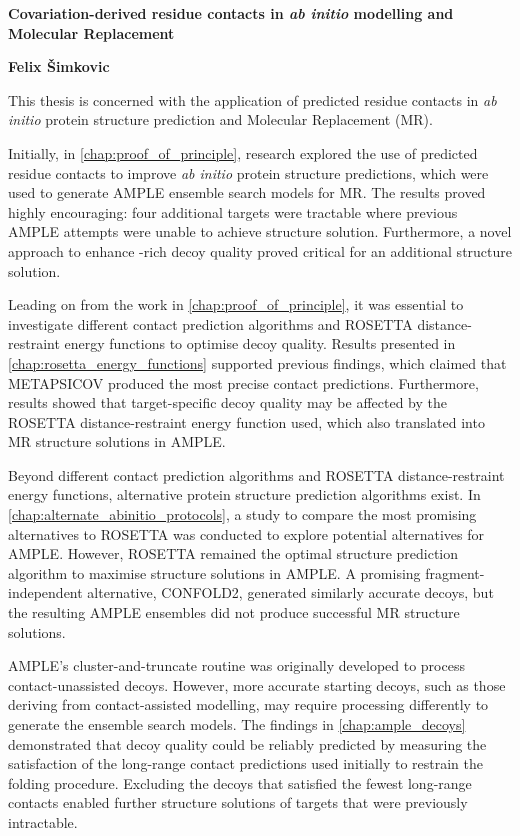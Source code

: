 \singlespacing
\begin{center}
    \Large
    \textbf{Covariation-derived residue contacts in \textit{ab initio} modelling and Molecular Replacement}

    \vspace{0.5cm}
    \large
    \textbf{Felix \v{S}imkovic}
    \vspace{0.5cm}
\end{center}

This thesis is concerned with the application of predicted residue contacts in \textit{ab initio} protein structure prediction and Molecular Replacement (MR).

Initially, in \cref{chap:proof_of_principle}, research explored the use of predicted residue contacts to improve \textit{ab initio} protein structure predictions, which were used to generate AMPLE ensemble search models for MR. The results proved highly encouraging: four additional targets were tractable where previous AMPLE attempts were unable to achieve structure solution. Furthermore, a novel approach to enhance \textbeta-rich decoy quality proved critical for an additional structure solution. 

Leading on from the work in \cref{chap:proof_of_principle}, it was essential to investigate different contact prediction algorithms and ROSETTA distance-restraint energy functions to optimise decoy quality. Results presented in \cref{chap:rosetta_energy_functions} supported previous findings, which claimed that METAPSICOV produced the most precise contact predictions. Furthermore, results showed that target-specific decoy quality may be affected by the ROSETTA distance-restraint energy function used, which also translated into MR structure solutions in AMPLE.

Beyond different contact prediction algorithms and ROSETTA distance-restraint energy functions, alternative protein structure prediction algorithms exist. In \cref{chap:alternate_abinitio_protocols}, a study to compare the most promising alternatives to ROSETTA was conducted to explore potential alternatives for AMPLE. However, ROSETTA remained the optimal structure prediction algorithm to maximise structure solutions in AMPLE. A promising fragment-independent alternative, CONFOLD2, generated similarly accurate decoys, but the resulting AMPLE ensembles did not produce successful MR structure solutions.

AMPLE's cluster-and-truncate routine was originally developed to process contact-unassisted decoys. However, more accurate starting decoys, such as those deriving from contact-assisted modelling, may require processing differently to generate the ensemble search models. The findings in \cref{chap:ample_decoys} demonstrated that decoy quality could be reliably predicted by measuring the satisfaction of the long-range contact predictions used initially to restrain the folding procedure. Excluding the decoys that satisfied the fewest long-range contacts enabled further structure solutions of targets that were previously intractable.

